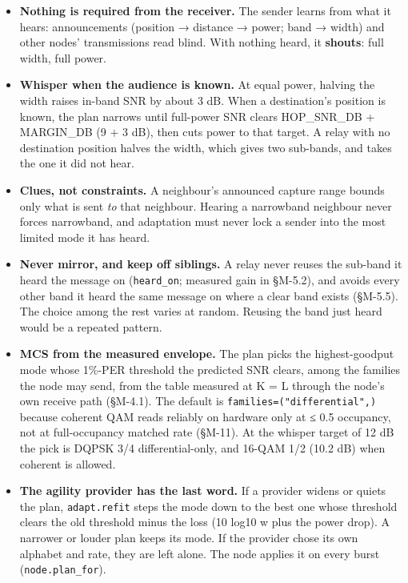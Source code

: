 \documentclass[10pt,letterpaper,twocolumn]{article}
\providecommand{\tightlist}{\setlength{\itemsep}{0pt}\setlength{\parskip}{0pt}}
\begin{document}
\begin{itemize}
\tightlist
\item
  \textbf{Nothing is required from the receiver.} The sender learns from what it hears: announcements (position → distance → power; band → width) and other nodes' transmissions read blind. With nothing heard, it \textbf{shouts}: full width, full power.
\item
  \textbf{Whisper when the audience is known.} At equal power, halving the width raises in-band SNR by about 3 dB. When a destination's position is known, the plan narrows until full-power SNR clears HOP\_SNR\_DB + MARGIN\_DB (9 + 3 dB), then cuts power to that target. A relay with no destination position halves the width, which gives two sub-bands, and takes the one it did not hear.
\item
  \textbf{Clues, not constraints.} A neighbour's announced capture range bounds only what is sent \emph{to} that neighbour. Hearing a narrowband neighbour never forces narrowband, and adaptation must never lock a sender into the most limited mode it has heard.
\item
  \textbf{Never mirror, and keep off siblings.} A relay never reuses the sub-band it heard the message on (\texttt{heard\_\allowbreak{}on}; measured gain in §M-5.2), and avoids every other band it heard the same message on where a clear band exists (§M-5.5). The choice among the rest varies at random. Reusing the band just heard would be a repeated pattern.
\item
  \textbf{MCS from the measured envelope.} The plan picks the highest-goodput mode whose 1\%-PER threshold the predicted SNR clears, among the families the node may send, from the table measured at K = L through the node's own receive path (§M-4.1). The default is \texttt{families=\allowbreak{}(\allowbreak{}"differential",\allowbreak{})\allowbreak{}} because coherent QAM reads reliably on hardware only at ≤ 0.5 occupancy, not at full-occupancy matched rate (§M-11). At the whisper target of 12 dB the pick is DQPSK 3/4 differential-only, and 16-QAM 1/2 (10.2 dB) when coherent is allowed.
\item
  \textbf{The agility provider has the last word.} If a provider widens or quiets the plan, \texttt{adapt.\allowbreak{}refit} steps the mode down to the best one whose threshold clears the old threshold minus the loss (10 log10 w plus the power drop). A narrower or louder plan keeps its mode. If the provider chose its own alphabet and rate, they are left alone. The node applies it on every burst (\texttt{node.\allowbreak{}plan\_\allowbreak{}for}).
\end{itemize}
\end{document}
